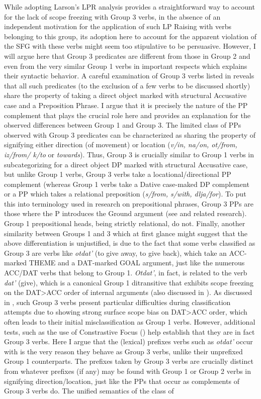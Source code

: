 \documentclass[output=paper,colorlinks,citecolor=brown,nonflat]{./langscibook}
\begin{document}
  While adopting Larson's LPR analysis provides a straightforward way to account for the lack of scope freezing with Group 3 verbs, in the absence of an independent motivation for the application of such LP Raising with verbs belonging to this group, its adoption here to account for the apparent violation of the SFG with these verbs might seem too stipulative to be persuasive. However, I will argue here that Group 3 predicates are different from those in Group 2 and even from the very similar Group 1 verbs in important respects which explains their syntactic behavior. A careful examination of Group 3 verbs listed in  reveals that all such predicates (to the exclusion of a few verbs to be discussed shortly) share the property of taking a direct object marked with structural Accusative case and a Preposition Phrase. I argue that it is precisely the nature of the PP complement that plays the crucial role here and provides an explanation for the observed differences between Group 1 and Group 3. The limited class of PPs observed with Group 3 predicates can be characterized as sharing the property of signifying either direction (of movement) or location (\textit{v/in, na/on, ot/from, iz/from/ k/to} or \textit{towards}). Thus, Group 3 is crucially similar to Group 1 verbs in subcategorizing for a direct object DP marked with structural Accusative case, but unlike Group 1 verbs, Group 3 verbs take a locational/directional PP complement (whereas Group 1 verbs take a Dative case-maked DP complement or a PP which takes a relational preposition (\textit{s/from, s/with, dlja/for}). To put this into terminology used in research on prepositional phrases, Group 3 PPs are those where the P introduces the Ground argument (see \citealt{Svenonius2003,Svenonius2007} and related research). Group 1 prepositional heads, being strictly relational, do not. Finally, another similarity between Groups 1 and 3 which at first glance might suggest that the above differentiation is unjustified, is due to the fact that some verbs classified as Group 3 are verbs like \textit{otdat'} (to give away, to give back), which take an ACC-marked THEME and a DAT-marked GOAL argument, just like the numerous ACC/DAT verbs that belong to Group 1. \textit{Otdat'}, in fact, is related to the verb \textit{dat'} (give), which is a canonical Group 1 ditransitive that exhibits scope freezing on the DAT>ACC order of internal arguments (also discussed in \citealt{BonehNash2017}). As discussed in \citet{Antonyuk2015}, such Group 3 verbs present particular difficulties during classification attempts due to showing strong surface scope bias on DAT>ACC order, which often leads to their initial misclassification as Group 1 verbs. However, additional tests, such as the use of Constrastive Focus (\citealt{AntonyukLarson2016}) help establish that they are in fact Group 3 verbs. Here I argue that the (lexical) prefixes verbs such as \textit{otdat'} occur with is the very reason they behave as Group 3 verbs, unlike their unprefixed Group 1 counterparts. The prefixes taken by Group 3 verbs are crucially distinct from whatever prefixes (if any) may be found with Group 1 or Group 2 verbs in signifying direction/location, just like the PPs that occur as complements of Group 3 verbs do. The unified semantics of the class of 
\end{document}
